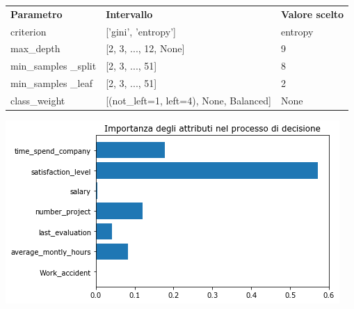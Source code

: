 \documentclass[a4paper]{article}
\begin{document}
\begin{table}[h]

\begin{minipage}[b]{0.4\textwidth}

\centering
\setlength{\tabcolsep}{10pt} %
\renewcommand{\arraystretch}{1.5} %
    \begin{tabularx}{\textwidth}{|XXX|}
	\hline
	\textbf{Parametro}       & \textbf{Intervallo}  & \textbf{Valore scelto} \\
	criterion                & ['gini', 'entropy']  & entropy   \\
	max\_depth               & [2, 3, ..., 12, None]  & 9       \\
	min\_samples \_split      & [2, 3, ..., 51] & 8         \\
	min\_samples \_leaf       & [2, 3, ..., 51] & 2        \\
	class\_weight            & [(not\_left=1, left=4), None, Balanced]   & None  \\\hline
	\end{tabularx}
          \label{tab:gridParams}

\end{minipage}
\hfill
\begin{minipage}[b]{0.55\textwidth}
\centering

\includegraphics[width=\textwidth]{feat_imp_best_model}
\label{fig:feat_imp_best_mod}
\end{minipage}

\end{table}
\end{document}
